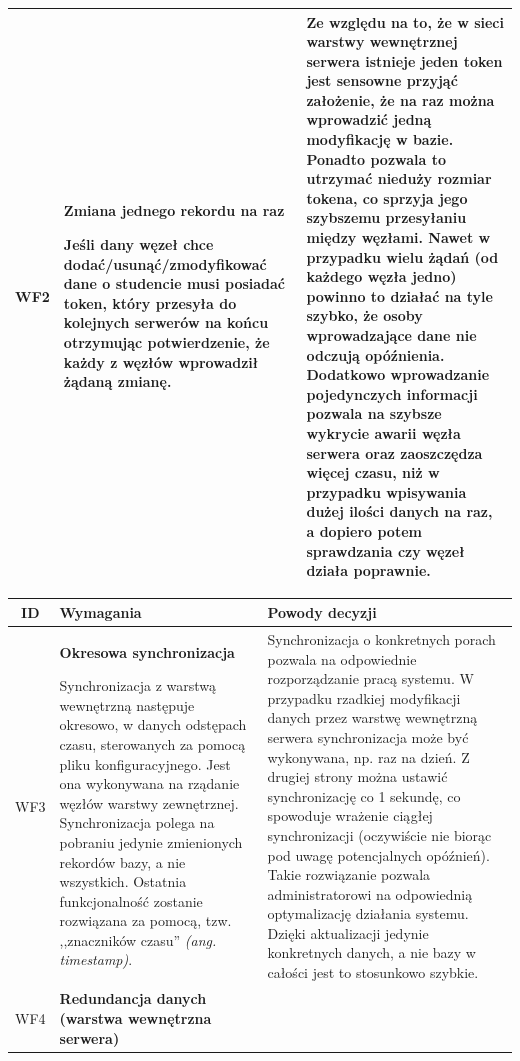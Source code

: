 {\begin{tabularx}{\textwidth}{|c|X|X|}
\label{z:WF2} WF2 &  \textbf{Zmiana jednego rekordu na raz}

Jeśli dany węzeł chce dodać/usunąć/zmodyfikować dane o studencie musi posiadać token, który przesyła do kolejnych serwerów na końcu otrzymując potwierdzenie, że każdy z węzłów wprowadził żądaną zmianę. & 
Ze względu na to, że w sieci warstwy wewnętrznej serwera istnieje jeden token jest sensowne przyjąć założenie, że na raz można wprowadzić jedną modyfikację w bazie. Ponadto pozwala to utrzymać nieduży rozmiar tokena, co sprzyja jego szybszemu przesyłaniu między węzłami. Nawet w przypadku wielu żądań (od każdego węzła jedno) powinno to działać na tyle szybko, że osoby wprowadzające dane nie odczują opóźnienia. Dodatkowo wprowadzanie pojedynczych informacji pozwala na szybsze wykrycie awarii węzła serwera oraz zaoszczędza więcej czasu, niż w przypadku wpisywania dużej ilości danych na raz, a dopiero potem sprawdzania czy węzeł działa poprawnie. \\
\hline

\end{tabularx}
\newpage
\begin{tabularx}{\textwidth}{|c|X|X|}
\hline
\textbf{ID} & \textbf{Wymagania}  & \textbf{Powody decyzji} \\
\hline

\label{z:WF3} WF3 & \textbf{Okresowa synchronizacja}

 Synchronizacja z warstwą wewnętrzną następuje okresowo, w danych odstępach czasu, sterowanych za pomocą pliku konfiguracyjnego. Jest ona wykonywana na rządanie węzłów warstwy zewnętrznej. Synchronizacja polega na pobraniu jedynie zmienionych rekordów bazy, a nie wszystkich. Ostatnia funkcjonalność zostanie rozwiązana za pomocą, tzw. ,,znaczników czasu'' \textit{(ang. timestamp)}. & Synchronizacja o konkretnych porach pozwala na odpowiednie rozporządzanie pracą systemu. W przypadku rzadkiej modyfikacji danych przez warstwę wewnętrzną serwera synchronizacja może być wykonywana, np. raz na dzień. Z drugiej strony można ustawić synchronizację co 1 sekundę, co spowoduje wrażenie ciągłej synchronizacji (oczywiście nie biorąc pod uwagę potencjalnych opóźnień). Takie rozwiązanie pozwala administratorowi na odpowiednią optymalizację działania systemu. Dzięki aktualizacji jedynie konkretnych danych, a nie bazy w całości jest to stosunkowo szybkie. \\
\hline

\label{z:WF4} WF4 & \textbf{Redundancja danych (warstwa wewnętrzna serwera)}


\end{tabularx}}
